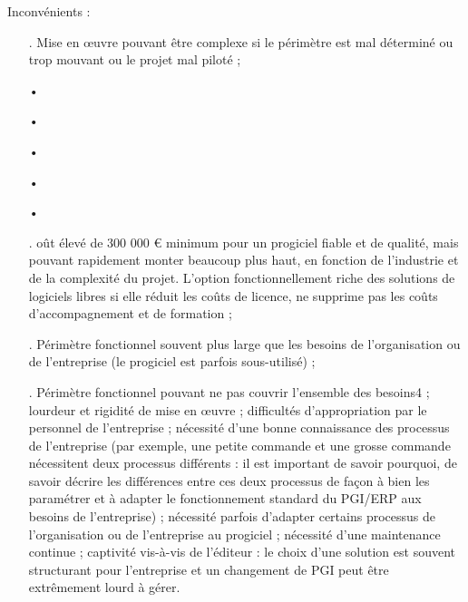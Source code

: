 Inconvénients :

\begin{itemize}
\item[.]Mise en œuvre pouvant être complexe si le périmètre est mal déterminé ou trop mouvant ou le projet mal piloté ;
\begin{scriptsize}
{\tiny •\begin{scriptsize}
{\tiny •\begin{scriptsize}
{\tiny •\begin{scriptsize}
{\tiny •\begin{scriptsize}
{\tiny •}
\end{scriptsize}}
\end{scriptsize}}
\end{scriptsize}}
\end{scriptsize}}
\end{scriptsize}\item[.]oût élevé de 300 000 € minimum pour un progiciel fiable et de qualité, mais pouvant rapidement monter beaucoup plus haut, en fonction de l'industrie et de la complexité du projet. L'option fonctionnellement riche des solutions de logiciels libres si elle réduit les coûts de licence, ne supprime pas les coûts d'accompagnement et de formation ;
\item[.]Périmètre fonctionnel souvent plus large que les besoins de l'organisation ou de l'entreprise (le progiciel est parfois sous-utilisé) ;
\item[.]Périmètre fonctionnel pouvant ne pas couvrir l'ensemble des besoins4 ;
    lourdeur et rigidité de mise en œuvre ;
    difficultés d'appropriation par le personnel de l'entreprise ;
    nécessité d'une bonne connaissance des processus de l'entreprise (par exemple, une petite commande et une grosse commande nécessitent deux processus différents : il est important de savoir pourquoi, de savoir décrire les différences entre ces deux processus de façon à bien les paramétrer et à adapter le fonctionnement standard du PGI/ERP aux besoins de l'entreprise) ;
    nécessité parfois d'adapter certains processus de l'organisation ou de l'entreprise au progiciel ;
    nécessité d'une maintenance continue ;
    captivité vis-à-vis de l'éditeur : le choix d'une solution est souvent structurant pour l'entreprise et un changement de PGI peut être extrêmement lourd à gérer.


\end{itemize}
